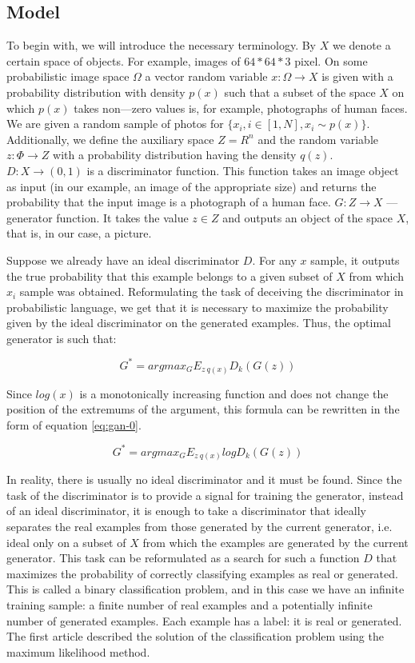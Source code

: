 \subsection{Model}

To begin with, we will introduce the necessary terminology. By $X$ we denote a certain space of objects. For example, images of $64*64*3$ pixel. On some probabilistic image space $\Omega$ a vector random variable $x:\Omega \rightarrow X$ is given with a probability distribution with density $p(x)$ such that a subset of the space $X$ on which $p(x)$ takes non—zero values is, for example, photographs of human faces. We are given a random sample of photos for $\{x_i, i \in [1, N], x_i \sim p(x)\}$. Additionally, we define the auxiliary space $Z=R^n$ and the random variable $z:\Phi \rightarrow Z$ with a probability distribution having the density $q(z)$. $D:X \rightarrow (0, 1)$ is a discriminator function. This function takes an image object as input (in our example, an image of the appropriate size) and returns the probability that the input image is a photograph of a human face. $G:Z \rightarrow X$ — generator function. It takes the value $z \in Z$ and outputs an object of the space $X$, that is, in our case, a picture.

Suppose we already have an ideal discriminator $D$. For any $x$ sample, it outputs the true probability that this example belongs to a given subset of $X$ from which ${x_i}$ sample was obtained. Reformulating the task of deceiving the discriminator in probabilistic language, we get that it is necessary to maximize the probability given by the ideal discriminator on the generated examples. Thus, the optimal generator is such that:

\begin{equation}
    \label{eq:gan-00}
    G^* = argmax_G E_{z~q(x)}D_k(G(z))
\end{equation}

Since $log(x)$ is a monotonically increasing function and does not change the position of the extremums of the argument, this formula can be rewritten in the form of equation \ref{eq:gan-0}.

\begin{equation}
    \label{eq:gan-0}
    G^* = argmax_G E_{z~q(x)} log D_k(G(z))
\end{equation}

In reality, there is usually no ideal discriminator and it must be found. Since the task of the discriminator is to provide a signal for training the generator, instead of an ideal discriminator, it is enough to take a discriminator that ideally separates the real examples from those generated by the current generator, i.e. ideal only on a subset of $X$ from which the examples are generated by the current generator. This task can be reformulated as a search for such a function $D$ that maximizes the probability of correctly classifying examples as real or generated. This is called a binary classification problem, and in this case we have an infinite training sample: a finite number of real examples and a potentially infinite number of generated examples. Each example has a label: it is real or generated. The first article described the solution of the classification problem using the maximum likelihood method.

